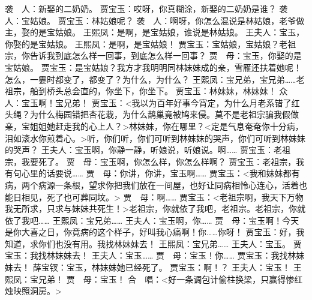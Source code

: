 \documentclass{article}
\begin{document}
袭　人：新娶的二奶奶。
贾宝玉：哎呀，你真糊涂，新娶的二奶奶是谁？
袭　人：宝姑娘。
贾宝玉：林姑娘呢？
袭　人：啊呀，你怎么混说是林姑娘，老爷做主，娶的是宝姑娘。
王熙凤：是啊，是宝姑娘，谁说是林姑娘。
王夫人：宝玉，你娶的是宝姑娘。
王熙凤：是啊，是宝姑娘！
贾宝玉：宝姑娘，宝姑娘？老祖宗，你告诉我到底怎么样一回事，到底怎么样一回事？
贾　母：宝玉，你娶的是宝姑娘。
贾宝玉：是宝姑娘？我方才我明明同林妹妹成的亲，雪雁还扶着她呢！怎么，一霎时都变了，都变了？为什么，为什么？
王熙凤：宝兄弟，宝兄弟……老祖宗，船到桥头总会直的，你坐下，你坐下。
贾宝玉：林妹妹，林妹妹！
众　人：宝玉啊！宝兄弟！
贾宝玉：<我以为百年好事今宵定，为什么月老系错了红头绳？为什么梅园错把杏花栽，为什么鹊巢竟被鸠来侵。莫不是老祖宗骗我假做亲，宝姐姐她赶走我的心上人？>林妹妹，你在哪里？<定是气息奄奄你十分病，泪如滚水你煎着心。>听，你们听，你们可听到林妹妹的哭声，你们可听到林妹妹的哭声？
王夫人：宝玉啊，你静一静，听娘说，听娘说。啊……
贾宝玉：老祖宗，我要死了。
贾　母：宝玉啊，你怎么样，你怎么样啊？
贾宝玉：老祖宗，我有句心里的话要说……
贾　母：你讲，你讲，宝玉啊……
贾宝玉：<我和妹妹都有病，两个病源一条根，望求你把我们放在一间屋，也好让同病相怜心连心，活着也能日相见，死了也可葬同坟。>
贾　母：啊……
贾宝玉：<老祖宗啊，我天下万物我无所求，只求与妹妹共死生！>老祖宗，你就依了我吧，老祖宗。老祖宗，你就依了我吧……
王熙凤：宝兄弟……
王夫人：宝玉啊，你……
贾　母：宝玉啊！今天是你大喜之日，你竟病的这个样子，好叫我心痛啊！你……你呀！
贾宝玉：好，我知道，求你们也没有用。我找林妹妹去！
王熙凤：宝兄弟……
王夫人：宝玉。
贾宝玉：我找林妹妹去！
王夫人：宝玉……
贾　母：宝玉！你……
贾宝玉：我找林妹妹去！
薛宝钗：宝玉，林妹妹她已经死了。
贾宝玉：啊！？
王夫人：宝玉！
王熙凤：宝兄弟！
贾　母：宝玉！
合　唱：<好一条调包计偷柱换梁，只赢得惨红烛映照洞房。>
\end{document}
